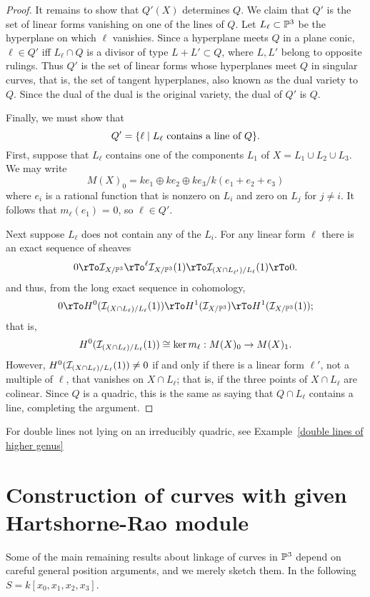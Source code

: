 \begin{example}
\begin{proof}
It remains to show that $Q'(X)$ determines $Q$. We claim that $Q'$ is the set of linear forms vanishing on one of the lines of $Q$. Let $L_{\ell}\subset {\mathbb P}^{3}$ be the hyperplane on which $\ell$ vanishies. Since a hyperplane meets $Q$ in a plane conic, $\ell\in Q'$ iff $L_{\ell}\cap Q$ is a divisor of type $L+L'\subset Q$, where 
$L,L'$ belong to opposite rulings. Thus $Q'$ is the set of linear forms whose hyperplanes meet $Q$ in singular curves, that is, the set of tangent hyperplanes, also known as the dual variety to $Q$. Since the dual of the dual is the original variety, the dual of $Q'$ is $Q$. 

Finally, we must show that 
$$
Q' = \{\ell \mid L_{\ell} \hbox{ contains a line of }Q\}.
$$
First, suppose that $L_{\ell}$ contains one of the components $L_{1}$ of $X = L_{1}\cup L_{2}\cup L_{3}$.
We may write 
$$
M(X)_{0} = ke_{1}\oplus ke_{2}\oplus ke_{3}/k(e_{1}+e_{2}+e_{3})
$$
where $e_{i}$ is a rational function that is nonzero on $L_{i}$ and zero on $L_{j}$ for $j\neq i$. It follows
that $m_{\ell}(e_{1})$ = 0, so $\ell\in Q'$.

Next suppose $L_{\ell}$ does not contain any of the $L_{i}$. For any linear form $\ell$ there is an exact sequence of sheaves
$$
0\rTo \sI_{X/\PP^{3}} \rTo^{\ell} \sI_{X/\PP^{3}}(1) \rTo \sI_{(X\cap L_{\ell'})/L_{\ell}}(1) \rTo 0.
$$
and thus, from the long exact sequence in cohomology,
$$
0\rTo H^{0}(\sI_{(X\cap L_{\ell})/L_{\ell}}(1)) \rTo H^{1}(\sI_{X/\PP^{3}} ) \rTo H^{1}(\sI_{X/\PP^{3}}(1)); 
$$
that is, 
$$
H^{0}({\mathcal I}_{(X\cap L_{\ell})/L_{\ell}}(1)) \cong \ker m_{\ell}: M(X)_{0} \to M(X)_{1}.
$$
However, $H^{0}({\mathcal I}_{(X\cap L_{\ell})/L_{\ell}}(1)) \neq 0$ if and only if there is a linear form
$\ell'$, not a multiple of $\ell$, that vanishes on $X\cap L_{\ell}$; that is, if the three points of $X\cap L_{\ell}$
are colinear. Since $Q$ is a quadric, this is the same as saying that $Q\cap L_{\ell}$ contains a line, completing the argument.
\end{proof}
\end{example}

For double lines not lying on an irreducibly quadric, see Example~\ref{double lines of higher genus}
\section{Construction of curves with given \\Hartshorne-Rao module}

Some of the main remaining results about linkage of curves in ${\mathbb P}^3$ depend on careful general position arguments, and we merely
sketch them. In the following $S = k[x_0,x_1,x_2,x_3]$.

